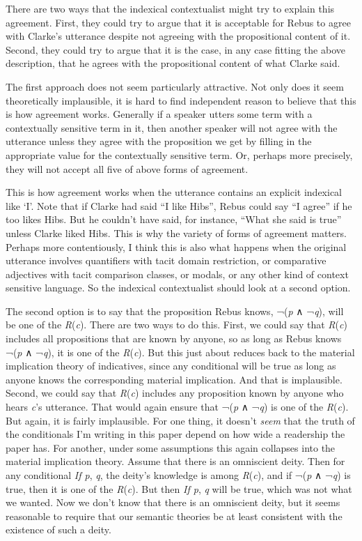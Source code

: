 \documentclass[
  10pt,
  letterpaper,
  DIV=11,
  numbers=noendperiod,
  twoside]{scrartcl}
\begin{document}
There are two ways that the indexical contextualist might try to explain
this agreement. First, they could try to argue that it is acceptable for
Rebus to agree with Clarke's utterance despite not agreeing with the
propositional content of it. Second, they could try to argue that it is
the case, in any case fitting the above description, that he agrees with
the propositional content of what Clarke said.

The first approach does not seem particularly attractive. Not only does
it seem theoretically implausible, it is hard to find independent reason
to believe that this is how agreement works. Generally if a speaker
utters some term with a contextually sensitive term in it, then another
speaker will not agree with the utterance unless they agree with the
proposition we get by filling in the appropriate value for the
contextually sensitive term. Or, perhaps more precisely, they will not
accept all five of above forms of agreement.

This is how agreement works when the utterance contains an explicit
indexical like `I'. Note that if Clarke had said ``I like Hibs'', Rebus
could say ``I agree'' if he too likes Hibs. But he couldn't have said,
for instance, ``What she said is true'' unless Clarke liked Hibs. This
is why the variety of forms of agreement matters. Perhaps more
contentiously, I think this is also what happens when the original
utterance involves quantifiers with tacit domain restriction, or
comparative adjectives with tacit comparison classes, or modals, or any
other kind of context sensitive language. So the indexical contextualist
should look at a second option.

The second option is to say that the proposition Rebus knows, ¬(\emph{p}
∧ ¬\emph{q}), will be one of the \emph{R}(\emph{c}). There are two ways
to do this. First, we could say that \emph{R}(\emph{c}) includes all
propositions that are known by anyone, so as long as Rebus knows
¬(\emph{p} ∧ ¬\emph{q}), it is one of the \emph{R}(\emph{c}). But this
just about reduces back to the material implication theory of
indicatives, since any conditional will be true as long as anyone knows
the corresponding material implication. And that is implausible. Second,
we could say that \emph{R}(\emph{c}) includes any proposition known by
anyone who hears \emph{c}'s utterance. That would again ensure that
¬(\emph{p} ∧ ¬\emph{q}) is one of the \emph{R}(\emph{c}). But again, it
is fairly implausible. For one thing, it doesn't \emph{seem} that the
truth of the conditionals I'm writing in this paper depend on how wide a
readership the paper has. For another, under some assumptions this again
collapses into the material implication theory. Assume that there is an
omniscient deity. Then for any conditional \emph{If p}, \emph{q}, the
deity's knowledge is among \emph{R}(\emph{c}), and if ¬(\emph{p} ∧
¬\emph{q}) is true, then it is one of the \emph{R}(\emph{c}). But then
\emph{If p}, \emph{q} will be true, which was not what we wanted. Now we
don't know that there is an omniscient deity, but it seems reasonable to
require that our semantic theories be at least consistent with the
existence of such a deity.
\end{document}
